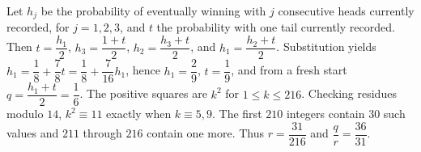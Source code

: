 Let $h_j$ be the probability of eventually winning with $j$ consecutive heads currently recorded, for $j=1,2,3$, and $t$ the probability with one tail currently recorded. Then $t=\dfrac{h_1}{2}$, $h_3=\dfrac{1+t}{2}$, $h_2=\dfrac{h_3+t}{2}$, and $h_1=\dfrac{h_2+t}{2}$. Substitution yields $h_1=\dfrac{1}{8}+\dfrac{7}{8}t=\dfrac{1}{8}+\dfrac{7}{16}h_1$, hence $h_1=\dfrac{2}{9}$, $t=\dfrac{1}{9}$, and from a fresh start $q=\dfrac{h_1+t}{2}=\dfrac{1}{6}$. The positive squares are $k^2$ for $1\le k\le216$. Checking residues modulo $14$, $k^2\equiv11$ exactly when $k\equiv5,9$. The first $210$ integers contain $30$ such values and $211$ through $216$ contain one more. Thus $r=\dfrac{31}{216}$ and $\boxed{\dfrac{q}{r}=\dfrac{36}{31}}$.
